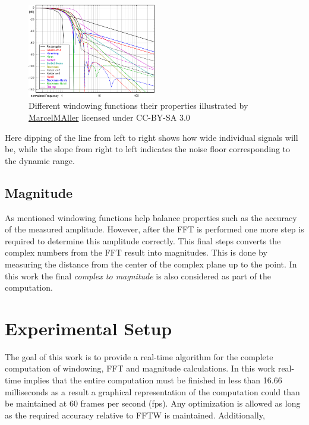 \documentclass[conference]{IEEEtran}
\begin{document}
\begin{center}
	\begin{figure}[H]
		\includegraphics[width=0.5\textwidth]{resources/images/Window-function.png}
		\captionsetup{justification=centering}
		\caption{Different windowing functions their properties illustrated by
			\href{https://en.wikipedia.org/wiki/User:Marcel\_M\%C3\%83\%C2\%BCller}{MarcelMAller}
			licensed under CC-BY-SA 3.0}
		\label{fig:windowingfuncs}
	\end{figure}
\end{center}

Here dipping of the line from left to right shows how wide individual signals
will be, while the slope from right to left indicates the noise floor
corresponding to the dynamic range.

\subsection{Magnitude}

As mentioned windowing functions help balance properties such as the accuracy
of the measured amplitude. However, after the FFT is performed one more step is
required to determine this amplitude correctly. This final steps converts the
complex numbers from the FFT result into magnitudes. This is done by measuring
the distance from the center of the complex plane up to the point. In this
work the final \textit{complex to magnitude} is also considered as part of the
computation.


\section{Experimental Setup}

The goal of this work is to provide a real-time algorithm for the complete
computation of windowing, FFT and magnitude calculations. In this work
real-time implies that the entire computation must be finished in less than
16.66 milliseconds as a result a graphical representation of the computation
could than be maintained at 60 frames per second (fps). Any optimization is
allowed as long as the required accuracy relative to FFTW is maintained.
Additionally,
\end{document}
